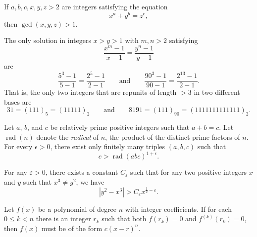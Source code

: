 \begin{conjecture}
  If $a,b,c,x,y,z> 2$ are integers satisfying the equation
  \begin{equation*}
    x^a+y^b=z^c,
  \end{equation*}
  then $\gcd(x,y,z)>1$.
\end{conjecture}

\begin{conjecture}
  The only solution in integers $x>y>1$ with $m,n>2$ satisfying
  \begin{equation*}
    \frac{x^m-1}{x-1}=\frac{y^n-1}{y-1}
  \end{equation*}
  are
  \begin{equation*}
    \frac{5^3-1}{5-1}=\frac{2^5-1}{2-1} \qquad\text{and}\qquad
    \frac{90^3-1}{90-1}=\frac{2^{13}-1}{2-1}.
  \end{equation*}
  That is, the only two integers that are repunits of length $>3$ in two different bases are
  \begin{equation*}
    31=(111)_5=(11111)_2\qquad\text{and}\qquad 8191=(111)_{90}=(1111111111111)_{2}.
  \end{equation*}
\end{conjecture}

\begin{conjecture}
  Let $a$, $b$, and $c$ be relatively prime positive integers such that $a+b=c$.
  Let $\operatorname{rad}(n)$ denote the \emph{radical} of $n$, the product of the distinct prime factors of $n$.
  For every $\epsilon > 0$, there exist only finitely many triples $(a,b,c)$ such that
  \begin{equation*}
    c > \operatorname{rad}(abc)^{1+\epsilon}.
  \end{equation*}
\end{conjecture}

\begin{conjecture}
  For any $\varepsilon>0$, there exists a constant $C_\varepsilon$ such that for any two positive integers $x$ and $y$ such that $x^3\neq y^2$, we have
  \begin{equation*}
    |y^2-x^3|>C_\varepsilon x^{\frac{1}{2}-\varepsilon}.
  \end{equation*}
\end{conjecture}

\begin{conjecture}
  Let $f(x)$ be a polynomial of degree $n$ with integer coefficients. If for each $0\leq k<n$ there is an integer $r_k$ such that both $f(r_k)=0$ and $f^{(k)}(r_k)=0$, then $f(x)$ must be of the form $c(x-r)^n$.
\end{conjecture}

